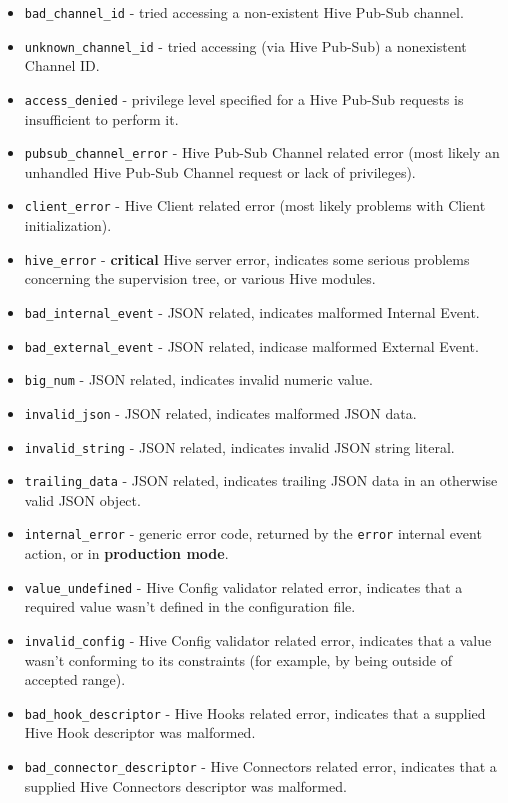 \documentclass[a4paper]{article}
\begin{document}
\begin{itemize}
\item \texttt{bad\_channel\_id} - tried accessing a non-existent Hive Pub-Sub channel.
\item \texttt{unknown\_channel\_id} - tried accessing (via Hive Pub-Sub) a nonexistent Channel ID.
\item \texttt{access\_denied} - privilege level specified for a Hive Pub-Sub requests is insufficient to perform it.
\item \texttt{pubsub\_channel\_error} - Hive Pub-Sub Channel related error (most likely an unhandled Hive Pub-Sub Channel request or lack of privileges).
\item \texttt{client\_error} - Hive Client related error (most likely problems with Client initialization).
\item \texttt{hive\_error} - \textbf{critical} Hive server error, indicates some serious problems concerning the supervision tree, or various Hive modules.
\item \texttt{bad\_internal\_event} - JSON related, indicates malformed Internal Event.
\item \texttt{bad\_external\_event} - JSON related, indicase malformed External Event.
\item \texttt{big\_num} - JSON related, indicates invalid numeric value.
\item \texttt{invalid\_json} - JSON related, indicates malformed JSON data.
\item \texttt{invalid\_string} - JSON related, indicates invalid JSON string literal.
\item \texttt{trailing\_data} - JSON related, indicates trailing JSON data in an otherwise valid JSON object.
\item \texttt{internal\_error} - generic error code, returned by the \texttt{error} internal event action, or in \textbf{production mode}.
\item \texttt{value\_undefined} - Hive Config validator related error, indicates that a required value wasn't defined in the configuration file.
\item \texttt{invalid\_config} - Hive Config validator related error, indicates that a value wasn't conforming to its constraints (for example, by being outside of accepted range).
\item \texttt{bad\_hook\_descriptor} - Hive Hooks related error, indicates that a supplied Hive Hook descriptor was malformed.
\item \texttt{bad\_connector\_descriptor} - Hive Connectors related error, indicates that a supplied Hive Connectors descriptor was malformed.

\end{itemize}
\end{document}
